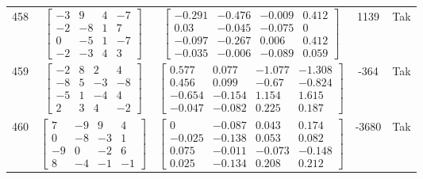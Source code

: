 \documentclass[a4paper,12pt]{article}
\begin{document}
\begin{tabular}{c c c c c}
458
&
$\begin{bmatrix} -3 & 9 & 4 & -7 \\ -2 & -8 & 1 & 7 \\ 0 & -5 & 1 & -7 \\ -2 & -3 & 4 & 3 \end{bmatrix}$
&
$\begin{bmatrix} -0.291 & -0.476 & -0.009 & 0.412 \\ 0.03 & -0.045 & -0.075 & 0 \\ -0.097 & -0.267 & 0.006 & 0.412 \\ -0.035 & -0.006 & -0.089 & 0.059 \end{bmatrix}$
&
1139
&
Tak
\\
459
&
$\begin{bmatrix} -2 & 8 & 2 & 4 \\ -8 & 5 & -3 & -8 \\ -5 & 1 & -4 & 4 \\ 2 & 3 & 4 & -2 \end{bmatrix}$
&
$\begin{bmatrix} 0.577 & 0.077 & -1.077 & -1.308 \\ 0.456 & 0.099 & -0.67 & -0.824 \\ -0.654 & -0.154 & 1.154 & 1.615 \\ -0.047 & -0.082 & 0.225 & 0.187 \end{bmatrix}$
&
-364
&
Tak
\\
460
&
$\begin{bmatrix} 7 & -9 & 9 & 4 \\ 0 & -8 & -3 & 1 \\ -9 & 0 & -2 & 6 \\ 8 & -4 & -1 & -1 \end{bmatrix}$
&
$\begin{bmatrix} 0 & -0.087 & 0.043 & 0.174 \\ -0.025 & -0.138 & 0.053 & 0.082 \\ 0.075 & -0.011 & -0.073 & -0.148 \\ 0.025 & -0.134 & 0.208 & 0.212 \end{bmatrix}$
&
-3680
&
Tak
\\
\end{tabular} \egroup \newpage
\end{document}
